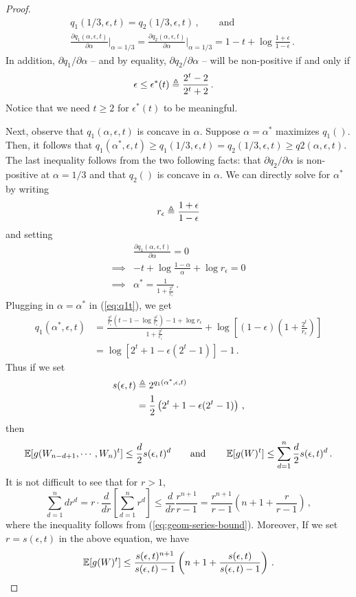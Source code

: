 \begin{proof}
\begin{align*}
&q_1(1/3, \epsilon, t) = q_2(1/3, \epsilon, t) \, , \qquad \text{and}\\
&\frac{\partial q_1(\alpha, \epsilon, t)}{\partial \alpha}\bigg\rvert_{\alpha = 1/3}
=
\frac{\partial q_2(\alpha, \epsilon, t)}{\partial \alpha}\bigg\rvert_{\alpha = 1/3}
= 
1 - t + \log \frac{1+\epsilon}{1-\epsilon} \, .
\end{align*}
In addition, $\partial q_1/\partial \alpha$ -- and by equality, $\partial q_2/\partial \alpha$  -- will be non-positive if and only if
\begin{align}
&\epsilon \leq \epsilon^*(t) \triangleq \frac{2^t - 2}{2^t + 2} \label{eq:epsstar-moment}
\, .
\end{align}
Notice that we need $t \geq 2$ for $\epsilon^*(t)$ to be meaningful. 

Next, observe that $q_1(\alpha, \epsilon, t)$ is concave in $\alpha$. Suppose $\alpha = \alpha^*$ maximizes $q_1()$. Then, it follows that $q_1(\alpha^*, \epsilon, t) \geq q_1(1/3, \epsilon, t) = q_2(1/3, \epsilon, t) \geq q2(\alpha, \epsilon, t)$. The last inequality follows from the two following facts: that $\partial q_2/\partial \alpha$ is non-positive at $\alpha = 1/3$ and that $q_2()$ is concave in $\alpha$. We can directly solve for $\alpha^*$ by writing \[r_\epsilon \triangleq \frac{1+\epsilon}{1-\epsilon}\] and setting
\begin{align*}
&\frac{\partial q_1(\alpha, \epsilon, t)}{\partial \alpha} = 0 \\
\implies& -t 
+ \log \frac{1-\alpha}{\alpha}
+ \log r_\epsilon
=0 \\
\implies& \alpha^* = \frac{1}{1+\frac{2^t}{r_\epsilon}}\, .
\end{align*}
Plugging in $\alpha = \alpha^*$ in (\ref{eq:q1t}), we get
\begin{align*}
q_1(\alpha^*, \epsilon, t)
&= \frac{ \frac{2^t}{r_\epsilon}(t - 1 - \log \frac{2^t}{r_\epsilon} ) - 1 + \log r_\epsilon }{1 + \frac{2^t}{r_\epsilon} }
+ \log \left[ (1-\epsilon) (1+\frac{2^t}{r_\epsilon})\right]\\
&= \log \left[2^t + 1 - \epsilon (2^t -1) \right] - 1\, .
\end{align*}
Thus if we set \begin{align*}
s(\epsilon, t) 
&\triangleq 2^{q_1(\alpha^*, \epsilon, t)} \\
&= \frac{1}{2}\left( 2^t + 1 - \epsilon (2^t -1) \right)\, ,
\end{align*}
then
\[
\operatorname{\mathbb{E}}[ g(W_{n-d+1}, \cdots, W_n)^t ] 
\leq
\frac{d}{2} s(\epsilon, t)^d
\qquad
\text{and}
\qquad
\operatorname{\mathbb{E}}[ g(W)^t ] 
\leq 
\sum_{d=1}^n{\frac{d}{2} s(\epsilon, t)^d}\, .
\]
It is not difficult to see that for $r> 1$,
\[
\sum_{d=1}^n{d r^d} 
= r \cdot \frac{d}{d r} \left[ \sum_{d=1}^n{r^d}\right] 
\leq \frac{d}{d r} \frac{r^{n+1}}{r-1} 
= \frac{r^{n+1}}{r-1} \left( n + 1 + \frac{r}{r-1}\right) \, ,
\]
where the inequality follows from (\ref{eq:geom-series-bound}). Moreover, If we set $r = s(\epsilon, t)$ in the above equation, we have 
\[
\operatorname{\mathbb{E}}[ g(W)^t ] 
\leq 
\frac{s(\epsilon, t)^{n+1}}{s(\epsilon, t)-1} \left( n + 1 + \frac{s(\epsilon, t)}{s(\epsilon, t)-1}\right)\, .
\]


\end{proof}
